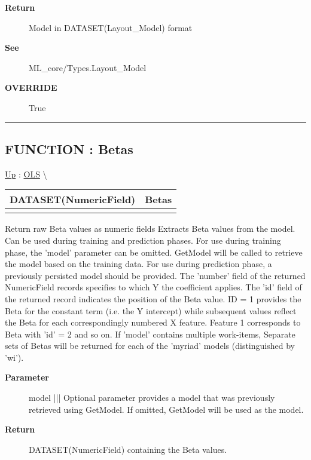\par
\begin{description}
\item [\textbf{Return}] Model in DATASET(Layout\_Model) format
\item [\textbf{See}] ML\_core/Types.Layout\_Model
\item [\textbf{OVERRIDE}] True
\end{description}

\rule{\linewidth}{0.5pt}
\subsection*{FUNCTION : Betas}
\hypertarget{ecldoc:linearregression.ols.betas}{}
\hyperlink{ecldoc:linearregression.ols}{Up} :
\hspace{0pt} \hyperlink{ecldoc:linearregression.ols}{OLS} \textbackslash 

{\renewcommand{\arraystretch}{1.5}
\begin{tabularx}{\textwidth}{|>{\raggedright\arraybackslash}l|X|}
\hline
\hspace{0pt}DATASET(NumericField) & Betas \\
\hline
\multicolumn{2}{|>{\raggedright\arraybackslash}X|}{\hspace{0pt}(DATASET(Layout\_Model) model=GetModel)} \\
\hline
\end{tabularx}
}

\par
Return raw Beta values as numeric fields Extracts Beta values from the model. Can be used during training and prediction phases. For use during training phase, the 'model' parameter can be omitted. GetModel will be called to retrieve the model based on the training data. For use during prediction phase, a previously persisted model should be provided. The 'number' field of the returned NumericField records specifies to which Y the coefficient applies. The 'id' field of the returned record indicates the position of the Beta value. ID = 1 provides the Beta for the constant term (i.e. the Y intercept) while subsequent values reflect the Beta for each correspondingly numbered X feature. Feature 1 corresponds to Beta with 'id' = 2 and so on. If 'model' contains multiple work-items, Separate sets of Betas will be returned for each of the 'myriad' models (distinguished by 'wi').

\par
\begin{description}
\item [\textbf{Parameter}] model ||| Optional parameter provides a model that was previously retrieved using GetModel. If omitted, GetModel will be used as the model.
\item [\textbf{Return}] DATASET(NumericField) containing the Beta values.
\end{description}

